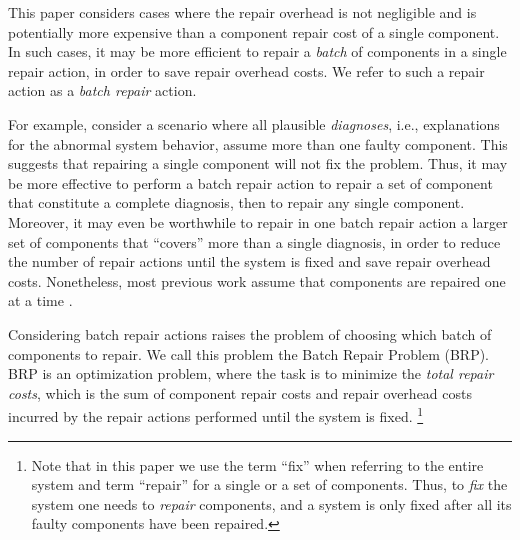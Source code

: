 \documentclass[review]{elsarticle}
\newcommand\meir[1]{\textcolor{red}{meir: #1}}
\newcommand\roni[1]{\textcolor{green}{roni: #1}}
\begin{document}
This paper considers cases where the repair overhead is not negligible and is potentially more expensive than a component repair cost of a single component. In such cases, it may be more efficient to repair a \emph{batch} of components in a single repair action, in order to save repair overhead costs. We refer to such a repair action as a \emph{batch repair} action. 


For example, consider a scenario where all plausible \emph{diagnoses}, i.e., explanations for the abnormal system behavior, assume more than one faulty component. This suggests that repairing a single component will not fix the problem. Thus, it may be more effective to perform a batch repair action to repair a set of component that constitute a complete diagnosis, then to repair any single component. 
Moreover, it may even be worthwhile to repair in one batch repair action a larger set of components that ``covers'' more than a single diagnosis, in order to reduce the number of repair actions until the system is fixed and save repair overhead costs. Nonetheless, most previous work assume that components are repaired one at a time \cite{heckerman1995decision,friedrich1992choosing,Nyberg12,Torta14}. 


Considering batch repair actions raises 
the problem of choosing which batch of components to repair. 
We call this problem the Batch Repair Problem (BRP). BRP is an optimization problem, where the task is to minimize the {\em total repair costs}, which is the sum of component repair costs and repair overhead costs incurred by the repair actions performed until the system is fixed. \footnote{%
Note that in this paper we use the term  ``fix'' when referring to the entire system and term ``repair'' for a single or a set of components.  Thus, 
to {\em fix} the system one needs to {\em repair} components, and a system is only fixed 
after all its faulty components have been repaired.}
\end{document}
